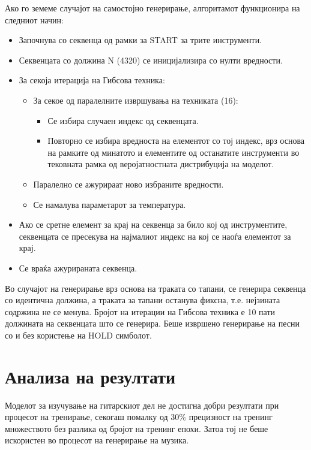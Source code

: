 Ако го земеме случајот на самостојно генерирање, алгоритамот функционира на следниот начин:
\begin{itemize}
    \item Започнува со секвенца од рамки за START за трите инструменти.
    \item Секвенцата со должина N (4320) се иницијализира со нулти вредности.
    \item За секоја итерација на Гибсова техника: \begin{itemize}
        \item За секое од паралелните извршувања на техниката (16): \begin{itemize}
            \item Се избира случаен индекс од секвенцата.
            \item Повторно се избира вредноста на елементот со тој индекс, врз основа на рамките од минатото и елементите од останатите инструменти во тековната рамка од веројатностната дистрибуција на моделот.
        \end{itemize}
    \item Паралелно се ажурираат ново избраните вредности.
    \item Се намалува параметарот за температура.
    \end{itemize}
    \item Ако се сретне елемент за крај на секвенца за било кој од инструментите, секвенцата се пресекува на најмалиот индекс на кој се наоѓа елементот за крај.
    \item Се враќа ажурираната секвенца.
\end{itemize}

Во случајот на генерирање врз основа на траката со тапани, се генерира секвенца со идентична должина, а траката за тапани останува фиксна, т.е. нејзината содржина не се менува. Бројот на итерации на Гибсова техника е 10 пати должината на секвенцата што се генерира. Беше извршено генерирање на песни со и без користење на HOLD симболот.

\section{Анализа на резултати}

Моделот за изучување на гитарскиот дел не достигна добри резултати при процесот на тренирање, секогаш помалку од 30\% прецизност на тренинг множеството без разлика од бројот на тренинг епохи. Затоа тој не беше искористен во процесот на генерирање на музика. 

